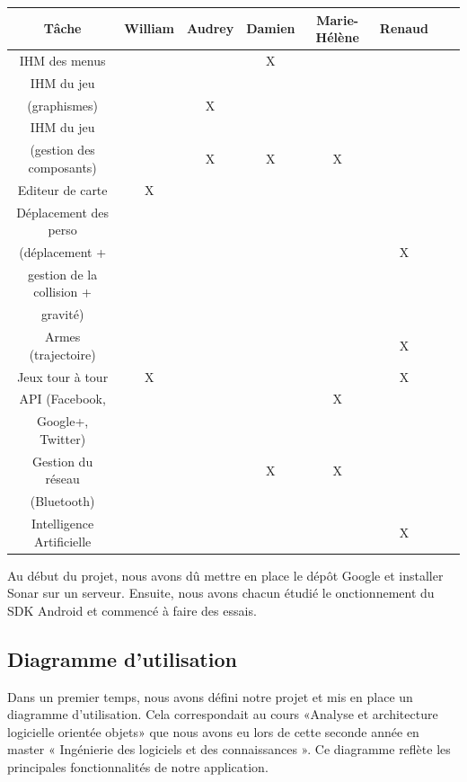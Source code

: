 \documentclass{report}
\begin{document}
\begin{tabular}{|c|c|c|c|c|c|c|c|}
\hline
{\bf Tâche } & {\bf William } & {\bf Audrey } & {\bf Damien } & {\bf Marie-Hélène } & {\bf Renaud }\\
\hline
{IHM des menus} & {} & {} & {X} & {} & {}\\
\hline
{IHM du jeu} & {} & {} & {} & {} & {} \\
{(graphismes)} & {} & {X} & {} & {} & {} \\
\hline
{IHM du jeu} & {} & {} & {} & {} & {}\\
{(gestion des composants)} & {} & {X} & {X} & {X} & {} \\
\hline
{Editeur de carte} & {X} & {} & {} & {} & {} \\
\hline
Déplacement des perso &&&&&\\
(déplacement + &&&&& X\\
gestion de la collision + &&&&&\\
 gravité) &&&&&\\
\hline
{Armes (trajectoire)} & {} & {} & {} & {} & {X} \\
\hline
{Jeux tour à tour} & {X} & {} & {} & {} & {X} \\
\hline
{API (Facebook,} & {} & {} & {} & {X} & {} \\
{ Google+, Twitter)} & {} & {} & {} & {} & {} \\
\hline
{Gestion du réseau} & {} & {} & {X} & {X} & {} \\
{(Bluetooth)} & {} & {} & {} & {} & {} \\
\hline
{Intelligence Artificielle} & {} & {} & {} & {} & {X}\\
\hline
\end{tabular}
\bigskip


Au début du projet, nous avons dû mettre en place le dépôt Google et
installer Sonar sur un serveur. Ensuite, nous avons chacun étudié le
onctionnement du SDK Android et commencé à faire des essais.

\subsection{Diagramme d’utilisation}
\bigskip


Dans un premier temps, nous avons défini notre projet et mis en place un
diagramme d’utilisation. Cela correspondait au cours «Analyse et
architecture logicielle orientée objets» que nous avons eu lors de cette
seconde année en master « Ingénierie des logiciels et des
connaissances ». Ce diagramme reflète les principales fonctionnalités
de notre application.
\end{document}
